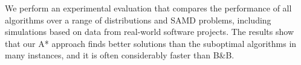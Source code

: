 \documentclass[letterpaper]{article} %
\newcommand{\samd}{\ac{SAMD}\xspace}
\newcommand{\astar}{\textsc{A*}\xspace}
\newcommand{\sampling}{\textsc{Sampling}\xspace}
\newcommand{\bnb}{\textsc{B\&B}\xspace}
\newcommand\Tal[1]{\nb{\textbf{Tal:}}{green}{#1}}
\newcommand\Roni[1]{\nb{\textbf{Roni:}}{blue}{#1}}
\begin{document}
We perform an experimental evaluation that compares the performance of all algorithms over a range of distributions and \samd problems, including simulations based on data from real-world software projects.
The results show that our \astar approach finds better solutions than the suboptimal algorithms in many instances, and it is often considerably faster than \bnb. %

\end{document}
